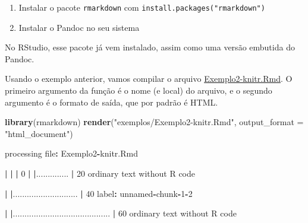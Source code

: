 \documentclass[10pt,a4paper]{book}
\newenvironment{Shaded}{\begin{snugshade}}{\end{snugshade}}
\newcommand{\KeywordTok}[1]{\textcolor[rgb]{0.13,0.29,0.53}{\textbf{#1}}}
\newcommand{\DataTypeTok}[1]{\textcolor[rgb]{0.13,0.29,0.53}{#1}}
\newcommand{\DecValTok}[1]{\textcolor[rgb]{0.00,0.00,0.81}{#1}}
\newcommand{\StringTok}[1]{\textcolor[rgb]{0.31,0.60,0.02}{#1}}
\newcommand{\OperatorTok}[1]{\textcolor[rgb]{0.81,0.36,0.00}{\textbf{#1}}}
\newcommand{\ErrorTok}[1]{\textcolor[rgb]{0.64,0.00,0.00}{\textbf{#1}}}
\newcommand{\NormalTok}[1]{#1}
\providecommand{\tightlist}{%
  \setlength{\itemsep}{0pt}\setlength{\parskip}{0pt}}
\begin{document}
\begin{enumerate}
\def\labelenumi{\arabic{enumi}.}
\tightlist
\item
  Instalar o pacote \texttt{rmarkdown} com
  \texttt{install.packages("rmarkdown")}
\item
  Instalar o Pandoc no seu sistema
\end{enumerate}

No RStudio, esse pacote já vem instalado, assim como uma versão embutida
do Pandoc.

Usando o exemplo anterior, vamos compilar o arquivo
\href{exemplos/Exemplo2-knitr.Rmd}{Exemplo2-knitr.Rmd}. O primeiro
argumento da função é o nome (e local) do arquivo, e o segundo argumento
é o formato de saída, que por padrão é HTML.

\begin{Shaded}
\begin{Highlighting}[]
\KeywordTok{library}\NormalTok{(rmarkdown)}
\KeywordTok{render}\NormalTok{(}\StringTok{"exemplos/Exemplo2-knitr.Rmd"}\NormalTok{,  }\DataTypeTok{output_format =} \StringTok{"html_document"}\NormalTok{)}


\NormalTok{processing file}\OperatorTok{:}\StringTok{ }\NormalTok{Exemplo2}\OperatorTok{-}\NormalTok{knitr.Rmd}

  \OperatorTok{|}\StringTok{                                                                            }
\StringTok{  }\ErrorTok{|}\StringTok{                                                                      }\ErrorTok{|}\StringTok{   }\DecValTok{0}\NormalTok{%
  \OperatorTok{|}\StringTok{                                                                            }
\StringTok{  }\ErrorTok{|}\NormalTok{..............                                                        }\OperatorTok{|}\StringTok{  }\DecValTok{20}\NormalTok{%
\NormalTok{  ordinary text without R code}


  \OperatorTok{|}\StringTok{                                                                            }
\StringTok{  }\ErrorTok{|}\NormalTok{............................                                          }\OperatorTok{|}\StringTok{  }\DecValTok{40}\NormalTok{%
\NormalTok{label}\OperatorTok{:}\StringTok{ }\NormalTok{unnamed}\OperatorTok{-}\NormalTok{chunk}\OperatorTok{-}\DecValTok{1}\OperatorTok{-}\DecValTok{2}

  \OperatorTok{|}\StringTok{                                                                            }
\StringTok{  }\ErrorTok{|}\NormalTok{..........................................                            }\OperatorTok{|}\StringTok{  }\DecValTok{60}\NormalTok{%
\NormalTok{  ordinary text without R code}


}}}}
\end{Highlighting}
\end{Shaded}
\end{document}
